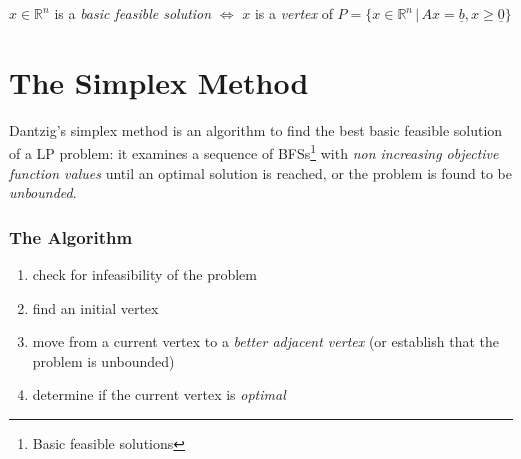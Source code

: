             \begin{theorem}
                $x \in \mathbb{R}^n$ is a \textit{basic feasible solution} $\Leftrightarrow$ $x$ is a \textit{vertex} of $P = \{x \in \mathbb{R}^n \,\vert\, Ax = \underline{b}, x \geq \underline{0}\}$
            \end{theorem}

    \section{The Simplex Method}
        Dantzig's simplex method is an algorithm to find the best basic feasible solution of a LP problem:
        it examines a sequence of BFSs\footnote{Basic feasible solutions} with \textit{non increasing objective function values} until an optimal solution is reached, or the problem is found to be \textit{unbounded}.

        \subsubsection{The Algorithm}
            \begin{enumerate}
                \item check for infeasibility of the problem
                \item find an initial vertex
                \item move from a current vertex to a \textit{better adjacent vertex} (or establish that the problem is unbounded)
                \item determine if the current vertex is \textit{optimal}
            \end{enumerate}

